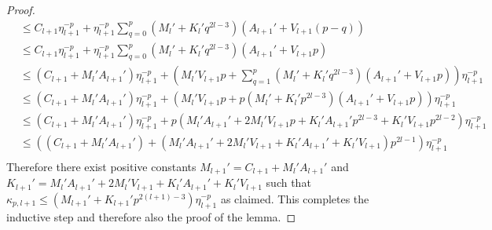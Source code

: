 \begin{proof}
\[\begin{aligned}
& \leq C_{l+1} \eta_{l+1}^{-p} + \eta_{l+1}^{-p} \sum_{q=0}^p (M_l' + K_l' q^{2l-3})(A_{l+1}' + V_{l+1}(p-q))\\
&\leq C_{l+1} \eta_{l+1}^{-p} + \eta_{l+1}^{-p} \sum_{q=0}^p (M_l' + K_l' q^{2l-3})(A_{l+1}' + V_{l+1}p)\\
&\leq (C_{l+1} + M_l'A_{l+1}')\eta_{l+1}^{-p} +  \left(M_l'V_{l+1}p + \sum_{q=1}^p (M_l' + K_l' q^{2l-3})(A_{l+1}' + V_{l+1}p) \right)\eta_{l+1}^{-p}\\
&\leq (C_{l+1} + M_l'A_{l+1}')\eta_{l+1}^{-p} +  \left(M_l'V_{l+1}p + p (M_l' + K_l' p^{2l-3})(A_{l+1}' + V_{l+1}p) \right)\eta_{l+1}^{-p}\\
&\leq (C_{l+1} + M_l'A_{l+1}')\eta_{l+1}^{-p} +  p\left( M_l' A_{l+1}' + 2M_l'V_{l+1}p + K_l'A_{l+1}' p^{2l-3} + K_l' V_{l+1} p^{2l-2} \right)\eta_{l+1}^{-p}\\
&\leq \left((C_{l+1} + M_l'A_{l+1}') +  \left( M_l' A_{l+1}' + 2M_l'V_{l+1} + K_l'A_{l+1}' + K_l' V_{l+1} \right)p^{2l-1}\right)\eta_{l+1}^{-p}\\
\end{aligned}
\]
Therefore there exist positive constants $M_{l+1}' = C_{l+1} + M_l'A_{l+1}'$ and $K_{l+1}' = M_l' A_{l+1}' + 2M_l'V_{l+1} + K_l'A_{l+1}' + K_l' V_{l+1}$ such that $\kappa_{p,l+1} \leq (M_{l+1}' + K_{l+1}'p^{2(l+1)-3})\eta_{l+1}^{-p}$ as claimed. This completes the inductive step and therefore also the proof of the lemma.
\end{proof}

















